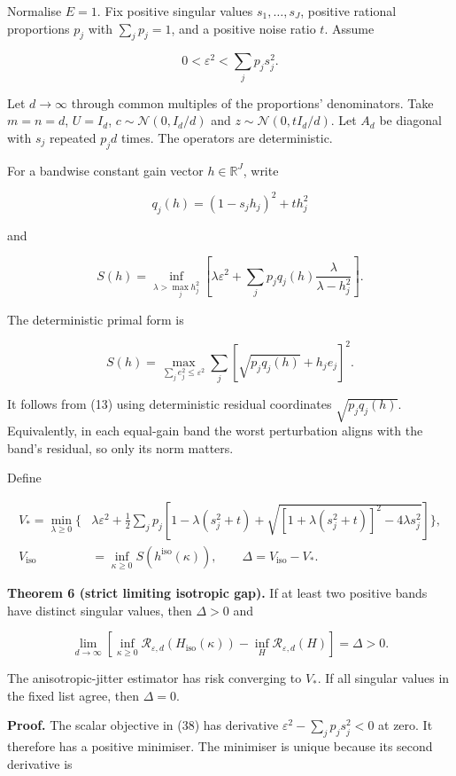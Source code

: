 \documentclass[11pt,a4paper]{article}
\begin{document}
Normalise \(E=1\). Fix positive singular values \(s_1,\ldots,s_J\),
positive rational proportions \(p_j\) with \(\sum_jp_j=1\), and a
positive noise ratio \(t\). Assume

\[
0<\varepsilon^2<\sum_jp_js_j^2.
\tag{35}
\]

Let \(d\to\infty\) through common multiples of the proportions'
denominators. Take \(m=n=d\), \(U=I_d\), \(c\sim\mathcal N(0,I_d/d)\)
and \(z\sim\mathcal N(0,tI_d/d)\). Let \(A_d\) be diagonal with \(s_j\)
repeated \(p_jd\) times. The operators are deterministic.

For a bandwise constant gain vector \(h\in\mathbb R^J\), write

\[
q_j(h)=(1-s_jh_j)^2+t h_j^2
\]

and

\[
S(h)=
\inf_{\lambda>\max_j h_j^2}
\left[
\lambda\varepsilon^2+
\sum_jp_jq_j(h)\frac{\lambda}{\lambda-h_j^2}
\right].
\tag{36}
\]

The deterministic primal form is

\[
S(h)=
\max_{\sum_j e_j^2\le\varepsilon^2}
\sum_j\left[\sqrt{p_jq_j(h)}+h_j e_j\right]^2.
\tag{37}
\]

It follows from (13) using deterministic residual coordinates
\(\sqrt{p_jq_j(h)}\). Equivalently, in each equal-gain band the worst
perturbation aligns with the band's residual, so only its norm matters.

Define

\[
\begin{aligned}
V_*=\min_{\lambda\ge0}\bigg\{&
\lambda\varepsilon^2+\frac12\sum_jp_j
\left[
1-\lambda(s_j^2+t)
+\sqrt{[1+\lambda(s_j^2+t)]^2-4\lambda s_j^2}
\right]\bigg\},
\\
V_{\mathrm{iso}}&=\inf_{\kappa\ge0}S(h^{\mathrm{iso}}(\kappa)),
\qquad \Delta=V_{\mathrm{iso}}-V_*.
\end{aligned}
\tag{38}
\]

\textbf{Theorem 6 (strict limiting isotropic gap).} If at least two
positive bands have distinct singular values, then \(\Delta>0\) and

\[
\lim_{d\to\infty}
\left[
\inf_{\kappa\ge0}\mathcal R_{\varepsilon,d}(H_{\mathrm{iso}}(\kappa))
-\inf_H\mathcal R_{\varepsilon,d}(H)
\right]=\Delta>0.
\tag{39}
\]

The anisotropic-jitter estimator has risk converging to \(V_*\). If all
singular values in the fixed list agree, then \(\Delta=0\).

\textbf{Proof.} The scalar objective in (38) has derivative
\(\varepsilon^2-\sum_jp_js_j^2<0\) at zero. It therefore has a positive
minimiser. The minimiser is unique because its second derivative is
\end{document}
